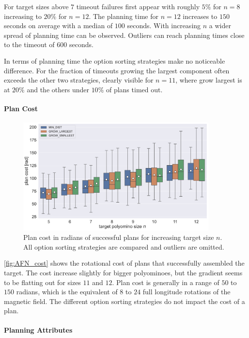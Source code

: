 For target sizes above $7$ timeout failures first appear with roughly $5\%$ for $n = 8$ increasing to $20\%$ for $n=12$.
The planning time for $n = 12$ increases to $150$ seconds on average with a median of $100$ seconds.
With increasing $n$ a wider spread of planning time can be observed.
Outliers can reach planning times close to the timeout of $600$ seconds.

In terms of planning time the option sorting strategies make no noticeable difference.
For the fraction of timeouts growing the largest component often exceeds the other two strategies, clearly visible for $n=11$, where grow largest is at $20\%$ and the others under $10\%$ of plans timed out.


\paragraph{Plan Cost}

\begin{figure}
	\centering
	\includegraphics[width=0.9\textwidth]{figures/plots/AFN_cost.pdf}
	\caption[Plan cost for increasing size]{Plan cost in radians of successful plans for increasing target size $n$. All option sorting strategies are compared and outliers are omitted.}
	\label{fig:AFN_cost}
\end{figure}

\autoref{fig:AFN_cost} shows the rotational cost of plans that successfully assembled the target.
The cost increase slightly for bigger polyominoes, but the gradient seems to be flatting out for sizes $11$ and $12$.
Plan cost is generally in a range of $50$ to $150$ radians, which is the equivalent of $8$ to $24$ full longitude rotations of the magnetic field.
The different option sorting strategies do not impact the cost of a plan.

\paragraph{Planning Attributes}

